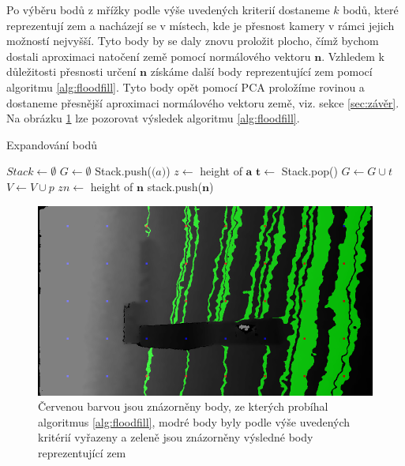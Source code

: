 \documentclass[twoside]{ctuthesis}
\newcommand{\tl}[1]{$\mathbf{#1}$}
\begin{document}
Po výběru bodů z mřížky podle výše uvedených kriterií dostaneme $k$ bodů, které reprezentují zem a nacházejí se v místech, kde je přesnost kamery v rámci jejich možností nejvyšší. Tyto body by se daly znovu proložit plocho, čímž bychom dostali aproximaci natočení země pomocí normálového vektoru \tl{n}. Vzhledem k důležitosti přesnosti určení \tl{n} získáme další body reprezentující zem pomocí algoritmu \ref{alg:floodfill}. Tyto body opět pomocí PCA proložíme rovinou a dostaneme přesnější aproximaci normálového vektoru země, viz. sekce \ref{sec:závěr}. Na obrázku \ref{fig:floodfill} lze pozorovat výsledek algoritmu \ref{alg:floodfill}.
    
    
\begin{algorithm}
    \caption{Expandování bodů }
    \label{alg:floodfill}
    \begin{algorithmic}
        \STATE $Stack \gets \emptyset$
        \STATE $G \gets \emptyset$
            \STATE Stack.push($\mathbf(a)$)
            \STATE $z \gets$ height of $\mathbf{a}$
                \STATE $\mathbf{t} \gets$ Stack.pop()
                \STATE $G \gets G \cup t$
                \STATE $V \gets V \cup p$
                    \STATE $zn \gets$ height of $\mathbf{n}$
                    \STATE stack.push($\mathbf{n}$)
                    \ENDIF
                \ENDFOR
            \ENDWHILE
        \ENDFOR
    \end{algorithmic}
\end{algorithm}

\begin{figure}
    \centering
    \includegraphics[width = \linewidth]{pictures/prob0001body_gnd.png}
    \caption{Červenou barvou jsou znázorněny body, ze kterých probíhal algoritmus \ref{alg:floodfill}, modré body byly podle výše uvedených kritérií vyřazeny a zeleně jsou znázorněny výsledné body reprezentující zem}
    \label{fig:floodfill}
\end{figure}
\end{document}
